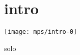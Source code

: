 \documentclass[11pt]{article}
\begin{document}

\makesongtitle
\section*{intro}
\texttt{[image: mps/intro-0]}


%    
%
{solo}

%    
\end{document}
